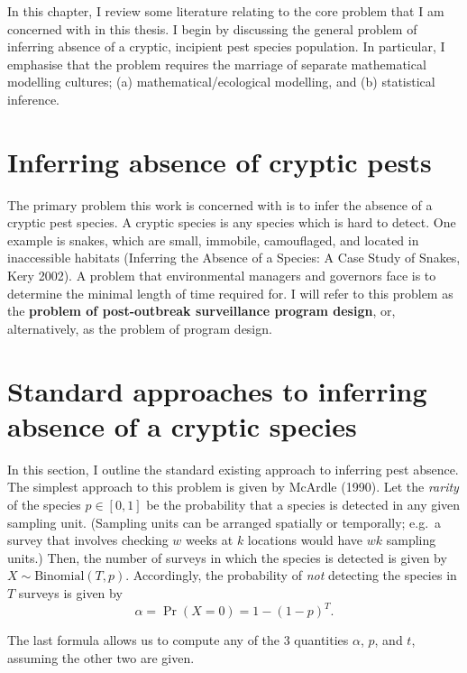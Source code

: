 \documentclass[
]{book}
\begin{document}
In this chapter, I review some literature relating to the core problem that I am concerned with in this thesis. I begin by discussing the general problem of inferring absence of a cryptic, incipient pest species population. In particular, I emphasise that the problem requires the marriage of separate mathematical modelling cultures; (a) mathematical/ecological modelling, and (b) statistical inference.

\hypertarget{inferring-absence-of-cryptic-pests}{%
\section{Inferring absence of cryptic pests}\label{inferring-absence-of-cryptic-pests}}

The primary problem this work is concerned with is to infer the absence of a cryptic pest species. A cryptic species is any species which is hard to detect. One example is snakes, which are small, immobile, camouflaged, and located in inaccessible habitats (Inferring the Absence of a Species: A Case Study of Snakes, Kery 2002). A problem that environmental managers and governors face is to determine the minimal length of time required for. I will refer to this problem as the \textbf{problem of post-outbreak surveillance program design}, or, alternatively, as the problem of program design.

\hypertarget{standard-approaches-to-inferring-absence-of-a-cryptic-species}{%
\section{Standard approaches to inferring absence of a cryptic species}\label{standard-approaches-to-inferring-absence-of-a-cryptic-species}}

In this section, I outline the standard existing approach to inferring pest absence. The simplest approach to this problem is given by McArdle (1990). Let the \emph{rarity} of the species \(p \in [0, 1]\) be the probability that a species is detected in any given sampling unit. (Sampling units can be arranged spatially or temporally; e.g.~a survey that involves checking \(w\) weeks at \(k\) locations would have \(wk\) sampling units.) Then, the number of surveys in which the species is detected is given by \(X \sim \mathrm{Binomial}(T, p)\). Accordingly, the probability of \emph{not} detecting the species in \(T\) surveys is given by
\[
\alpha = \Pr(X = 0) = 1 - (1 - p)^T.
\]

The last formula allows us to compute any of the 3 quantities \(\alpha\), \(p\), and \(t\), assuming the other two are given.
\end{document}
